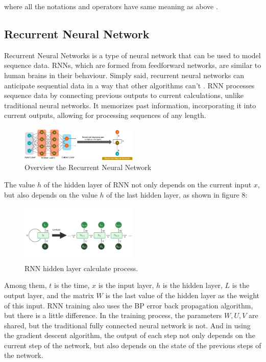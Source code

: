 \documentclass{ieeeojies}
\begin{document}
where all the notations and operators have same meaning as above \cite{b4}.
\subsection{Recurrent Neural Network}
Recurrent Neural Networks is a type of neural network that can be used to model sequence data. RNNs, which are formed from feedforward networks, are similar to human brains in their behaviour. Simply said, recurrent neural networks can anticipate sequential data in a way that other algorithms can’t \cite{b10}. RNN processes sequence data by connecting previous outputs to current calculations, unlike traditional neural networks. It memorizes past information, incorporating it into current outputs, allowing for processing sequences of any length.
\begin{figure} [H]
    \centering
    \includegraphics[width=0.5\textwidth]{bibliography/Figure/RNN_overview.png}
    \caption{Overview the Recurrent Neural Network}
    \label{fig:rnn-overview}
\end{figure}

The value $h$ of the hidden layer of RNN not only depends on the current input $x$, but also depends on the value $h$ of the last hidden layer, as shown in figure 8:
\begin{figure} [H]
    \centering
    \includegraphics[width=0.5\textwidth]{bibliography/Figure/What-is-Recurrent-Neural-Network.jpg}
    \caption{RNN hidden layer calculate process.}
    \label{fig:rnn-hidden-layer}
\end{figure}
Among them, $t$ is the time, $x$ is the input layer, $h$ is the hidden layer, $L$ is the output layer, and the matrix $W$ is the last value of the hidden layer as the weight of this input. RNN training also uses the BP error back propagation algorithm, but there is a little difference. In the training process, the parameters $W, U, V$ are shared, but the traditional fully connected neural network is not. And in using the gradient descent algorithm, the output of each step not only depends on the current step of the network, but also depends on the state of the previous steps of the network.
\end{document}
